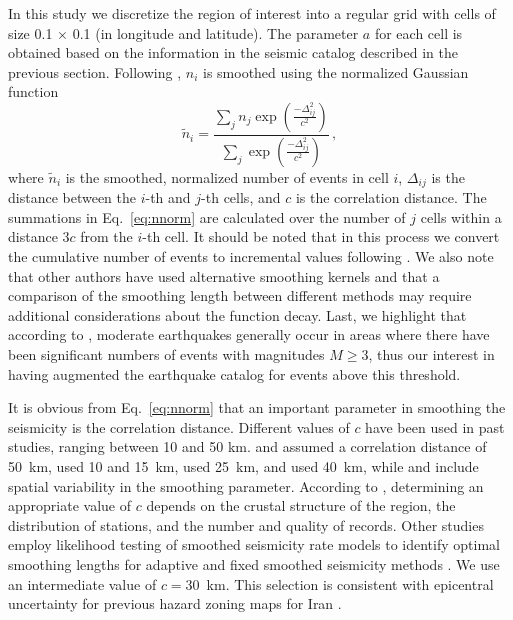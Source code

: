 In this study we discretize the region of interest into a regular grid with cells of size 0.1\textdegree{} $\times$ 0.1\textdegree{} (in longitude and latitude). The parameter $a$ for each cell is obtained based on the information in the seismic catalog described in the previous section. Following \citet{Frankel1995}, $n_i$ is smoothed using the normalized Gaussian function
%
\begin{equation}
	\tilde{n}_i = \frac
		{ \sum_{j} n_{j} \exp \left( \frac{ -\Delta_{ij}^{2} }{ c^2 } \right) }
		{ \sum_{j} \exp \left( \frac{ -\Delta_{ij}^{2} }{ c^2 } \right) }
	\, ,
	\label{eq:nnorm}
\end{equation}
%
where $\tilde{n}_i$ is the smoothed, normalized number of events in cell $i$, $\Delta_{ij}$ is the distance between the $i$-th and $j$-th cells, and $c$ is the correlation distance. The summations in Eq.~\ref{eq:nnorm} are calculated over the number of $j$ cells within a distance $3c$ from the $i$-th cell. It should be noted that in this process we convert the cumulative number of events to incremental values following \citet{Herrmann1977}. We also note that other authors have used alternative smoothing kernels \citep[e.g.,][]{Moschetti2015} and that a comparison of the smoothing length between different methods may require additional considerations about the function decay. Last, we highlight that according to \citet{Frankel1995}, moderate earthquakes generally occur in areas where there have been significant numbers of events with magnitudes $M \geq 3$, thus our interest in having augmented the earthquake catalog for events above this threshold.

It is obvious from Eq.~\ref{eq:nnorm} that an important parameter in smoothing the seismicity is the correlation distance. Different values of $c$ have been used in past studies, ranging between 10 and 50 km. \citet{Frankel1995} and \citet{Boyd2008} assumed a correlation distance of 50~km, \citet{Foteva2006} used 10 and 15~km, \citet{Barani2007} used 25~km, and \citet{Khodaverdian_2016_BSSA} used 40~km, while \citet{Boyd2007} and \citet{Petersen2015} include spatial variability in the smoothing parameter. According to \citet{Mirzaei1997}, determining an appropriate value of $c$ depends on the crustal structure of the region, the distribution of stations, and the number and quality of records. Other studies employ likelihood testing of smoothed seismicity rate models to identify optimal smoothing lengths for adaptive and fixed smoothed seismicity methods \citep[e.g.,][]{Werner2011, Moschetti2015}. We use an intermediate value of $c = 30$~km. This selection is consistent with epicentral uncertainty for previous hazard zoning maps for Iran \citep[see][]{Zare2012}.

